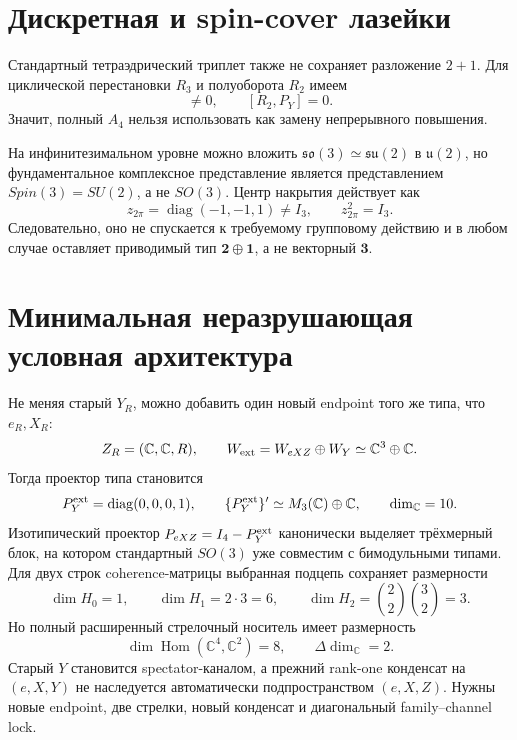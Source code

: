 \section{Дискретная и spin-cover лазейки}

Стандартный тетраэдрический триплет также не сохраняет разложение $2+1$.
Для циклической перестановки $R_3$ и полуоборота $R_2$ имеем
\begin{equation}
 [R_3,P_Y]\ne0,
 \qquad
 [R_2,P_Y]=0.
 \label{eq:v8-channel-promotion-a4-type-test}
\end{equation}
Значит, полный $A_4$ нельзя использовать как замену непрерывного повышения.

На инфинитезимальном уровне можно вложить $\mathfrak{so}(3)\simeq
\mathfrak{su}(2)$ в $\mathfrak u(2)$, но фундаментальное комплексное
представление является представлением $Spin(3)=SU(2)$, а не $SO(3)$.
Центр накрытия действует как
\begin{equation}
 z_{2\pi}=\operatorname{diag}(-1,-1,1)\ne I_3,
 \qquad
 z_{2\pi}^2=I_3.
 \label{eq:v8-channel-promotion-spin-cover-obstruction}
\end{equation}
Следовательно, оно не спускается к требуемому групповому действию и в любом
случае оставляет приводимый тип $\mathbf2\oplus\mathbf1$, а не векторный
$\mathbf3$.

\section{Минимальная неразрушающая условная архитектура}

Не меняя старый $Y_R$, можно добавить один новый endpoint того же типа, что
$e_R,X_R$:
\begin{equation}
 Z_R=(\mathbb C,\mathbb C,R),
 \qquad
 W_{\rm ext}=W_{eXZ}\oplus W_Y\simeq\mathbb C^3\oplus\mathbb C.
 \label{eq:v8-channel-promotion-minimal-extension}
\end{equation}
Тогда проектор типа становится
\begin{equation}
 P_Y^{\rm ext}=\operatorname{diag}(0,0,0,1),
 \qquad
 \{P_Y^{\rm ext}\}'\simeq M_3(\mathbb C)\oplus\mathbb C,
 \qquad
 \dim_{\mathbb C}=10.
 \label{eq:v8-channel-promotion-extended-commutant}
\end{equation}
Изотипический проектор $P_{eXZ}=I_4-P_Y^{\rm ext}$ канонически выделяет
трёхмерный блок, на котором стандартный $SO(3)$ уже совместим с
бимодульными типами. Для двух строк coherence-матрицы выбранная подцепь
сохраняет размерности
\begin{equation}
 \dim H_0=1,
 \qquad
 \dim H_1=2\cdot3=6,
 \qquad
 \dim H_2=\binom22\binom32=3.
 \label{eq:v8-channel-promotion-selected-chain-dimensions}
\end{equation}
Но полный расширенный стрелочный носитель имеет размерность
\begin{equation}
 \dim\operatorname{Hom}(\mathbb C^4,\mathbb C^2)=8,
 \qquad
 \Delta\dim_{\mathbb C}=2.
 \label{eq:v8-channel-promotion-extension-cost}
\end{equation}
Старый $Y$ становится spectator-каналом, а прежний rank-one конденсат на
$(e,X,Y)$ не наследуется автоматически подпространством $(e,X,Z)$. Нужны
новые endpoint, две стрелки, новый конденсат и диагональный family--channel
lock.

